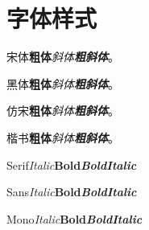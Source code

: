\documentclass[type = bachelor]{whu-thesis}
\begin{document}
\section{字体样式}
宋体\quad \textbf{粗体}\quad \textit{斜体}\quad \textbf{\textit{粗斜体}}。

{\heiti 黑体\quad \textbf{粗体}\quad \textit{斜体}\quad \textbf{\textit{粗斜体}}}。

{\fangsong 仿宋\quad \textbf{粗体}\quad \textit{斜体}\quad \textbf{\textit{粗斜体}}}。

{\kaishu 楷书\quad \textbf{粗体}\quad \textit{斜体}\quad \textbf{\textit{粗斜体}}}。

Serif\quad \textit{Italic}\quad \textbf{Bold}\quad \textbf{\textit{BoldItalic}}

{\sffamily Sans\quad \textit{Italic}\quad \textbf{Bold}\quad \textbf{\textit{BoldItalic}}}

{\ttfamily Mono\quad \textit{Italic}\quad \textbf{Bold}\quad \textbf{\textit{BoldItalic}}}
\end{document}
